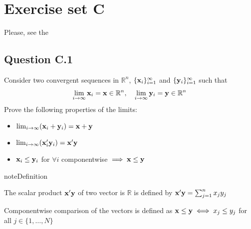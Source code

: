 \documentclass[letterpaper,10pt,english]{jupyterBook}
\begin{document}
\sphinxstepscope


\chapter{Exercise set C}
\label{\detokenize{04.exercises.C:exercise-set-c}}\label{\detokenize{04.exercises.C::doc}}
\sphinxAtStartPar
Please, see the
{\hyperref[\detokenize{02.exercises.A::doc}]{}}


\section{Question C.1}
\label{\detokenize{04.exercises.C:question-c-1}}
\sphinxAtStartPar
Consider two convergent sequences in \(\mathbb{R}^n\), \(\{{\bf x}_i\}_{i=1}^\infty\) and
\(\{{\bf y}_i\}_{i=1}^\infty\) such that
\begin{equation*}
\begin{split}
\lim_{i \to \infty} {\bf x}_i = {\bf x} \in \mathbb{R}^n, \quad
\lim_{i \to \infty} {\bf y}_i = {\bf y} \in \mathbb{R}^n
\end{split}
\end{equation*}
\sphinxAtStartPar
Prove the following properties of the limits:
\begin{itemize}
\item {} 
\sphinxAtStartPar
\(\lim_{i \to \infty} ({\bf x}_i+{\bf y}_i) = {\bf x} + {\bf y}\)

\item {} 
\sphinxAtStartPar
\(\lim_{i \to \infty} ({\bf x}_i'{\bf y}_i) = {\bf x}'{\bf y}\)

\item {} 
\sphinxAtStartPar
\({\bf x}_i \le {\bf y}_i\) for \(\forall i\) component\sphinxhyphen{}wise \(\implies {\bf x} \le {\bf y}\)

\end{itemize}

\begin{sphinxadmonition}{note}{Definition}

\sphinxAtStartPar
The scalar product \({\bf x}'{\bf y}\) of two vector is \(\mathbb{R}\) is defined by \({\bf x}'{\bf y} = \sum_{j=1}^n x_j y_j\)

\sphinxAtStartPar
Component\sphinxhyphen{}wise comparison of the vectors is defined as \({\bf x} \le {\bf y} \iff x_j \le y_j\) for all \(j\in\{1,\dots,N\}\)
\end{sphinxadmonition}
\end{document}
